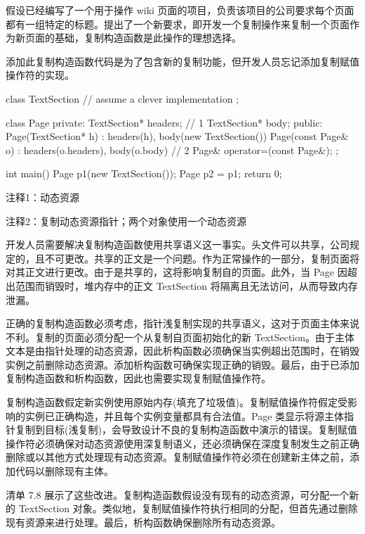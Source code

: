 假设已经编写了一个用于操作 wiki 页面的项目，负责该项目的公司要求每个页面都有一组特定的标题。提出了一个新要求，即开发一个复制操作来复制一个页面作为新页面的基础，复制构造函数是此操作的理想选择。

添加此复制构造函数代码是为了包含新的复制功能，但开发人员忘记添加复制赋值操作符的实现。


\begin{cpp}
class TextSection {
  // assume a clever implementation
};

class Page {
private:
  TextSection* headers; // 1
  TextSection* body;
public:
  Page(TextSection* h) : headers(h), body(new TextSection()) {}
  Page(const Page& o) : headers(o.headers), body(o.body) {} // 2
  Page& operator=(const Page&);
};

int main() {
  Page p1(new TextSection());
  Page p2 = p1;
  return 0;
}
\end{cpp}

{\footnotesize
注释1：动态资源

注释2：复制动态资源指针；两个对象使用一个动态资源
}


开发人员需要解决复制构造函数使用共享语义这一事实。头文件可以共享，公司规定的，且不可更改。共享的正文是一个问题。作为正常操作的一部分，复制页面将对其正文进行更改。由于是共享的，这将影响复制自的页面。此外，当 Page 因超出范围而销毁时，堆内存中的正文 TextSection 将隔离且无法访问，从而导致内存泄漏。

正确的复制构造函数必须考虑，指针浅复制实现的共享语义，这对于页面主体来说不利。复制的页面必须分配一个从复制自页面初始化的新 TextSection。由于主体文本是由指针处理的动态资源，因此析构函数必须确保当实例超出范围时，在销毁实例之前删除动态资源。添加析构函数可确保实现正确的销毁。最后，由于已添加复制构造函数和析构函数，因此也需要实现复制赋值操作符。

复制构造函数假定新实例使用原始内存(填充了垃圾值)。复制赋值操作符假定受影响的实例已正确构造，并且每个实例变量都具有合法值。Page 类显示将源主体指针复制到目标(浅复制)，会导致设计不良的复制构造函数中演示的错误。复制赋值操作符必须确保对动态资源使用深复制语义，还必须确保在深度复制发生之前正确删除或以其他方式处理现有动态资源。复制赋值操作符必须在创建新主体之前，添加代码以删除现有主体。


清单 7.8 展示了这些改进。复制构造函数假设没有现有的动态资源，可分配一个新的 TextSection 对象。类似地，复制赋值操作符执行相同的分配，但首先通过删除现有资源来进行处理。最后，析构函数确保删除所有动态资源。

